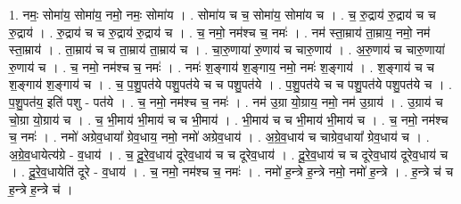 \documentclass[17pt]{extarticle}
\begin{document}
1. नमः॒ सोमा॑य॒ सोमा॑य॒ नमो॒ नमः॒ सोमा॑य । . सोमा॑य च च॒ सोमा॑य॒ सोमा॑य च । . च॒ रु॒द्राय॑ रु॒द्राय॑ च च रु॒द्राय॑ । . रु॒द्राय॑ च च रु॒द्राय॑ रु॒द्राय॑ च । . च॒ नमो॒ नम॑श्च च॒ नमः॑ । . नम॑ स्ता॒म्राय॑ ता॒म्राय॒ नमो॒ नम॑ स्ता॒म्राय॑ । . ता॒म्राय॑ च च ता॒म्राय॑ ता॒म्राय॑ च । . चा॒रु॒णाया॑ रु॒णाय॑ च चारु॒णाय॑ । . अ॒रु॒णाय॑ च चारु॒णाया॑ रु॒णाय॑ च । . च॒ नमो॒ नम॑श्च च॒ नमः॑ । . नमः॑ श॒ङ्गाय॑ श॒ङ्गाय॒ नमो॒ नमः॑ श॒ङ्गाय॑ । . श॒ङ्गाय॑ च च श॒ङ्गाय॑ श॒ङ्गाय॑ च । . च॒ प॒शु॒पत॑ये पशु॒पत॑ये च च पशु॒पत॑ये । . प॒शु॒पत॑ये च च पशु॒पत॑ये पशु॒पत॑ये च । . प॒शु॒पत॑य॒ इति॑ पशु - पत॑ये । . च॒ नमो॒ नम॑श्च च॒ नमः॑ । . नम॑ उ॒ग्रा यो॒ग्राय॒ नमो॒ नम॑ उ॒ग्राय॑ । . उ॒ग्राय॑ च चो॒ग्रा यो॒ग्राय॑ च । . च॒ भी॒माय॑ भी॒माय॑ च च भी॒माय॑ । . भी॒माय॑ च च भी॒माय॑ भी॒माय॑ च । . च॒ नमो॒ नम॑श्च च॒ नमः॑ । . नमो॑ अग्रेव॒धाया᳚ ग्रेव॒धाय॒ नमो॒ नमो॑ अग्रेव॒धाय॑ । . अ॒ग्रे॒व॒धाय॑ च चाग्रेव॒धाया᳚ ग्रेव॒धाय॑ च । . अ॒ग्रे॒व॒धायेत्य॑ग्रे - व॒धाय॑ । . च॒ दू॒रे॒व॒धाय॑ दूरेव॒धाय॑ च च दूरेव॒धाय॑ । . दू॒रे॒व॒धाय॑ च च दूरेव॒धाय॑ दूरेव॒धाय॑ च । . दू॒रे॒व॒धायेति॑ दूरे - व॒धाय॑ । . च॒ नमो॒ नम॑श्च च॒ नमः॑ । . नमो॑ ह॒न्त्रे ह॒न्त्रे नमो॒ नमो॑ ह॒न्त्रे । . ह॒न्त्रे च॑ च ह॒न्त्रे ह॒न्त्रे च॑ । \newline
\end{document}
